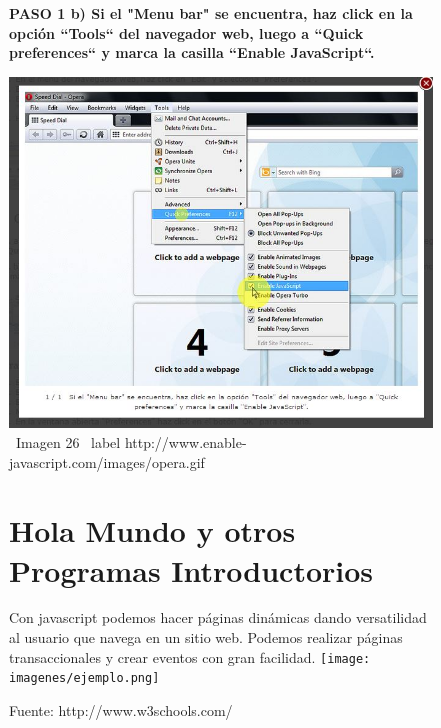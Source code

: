 \documentclass[11pt]{article} %
\begin{document}
\begin{figure}
\begin{center}

\begin{center}
\bf PASO 1
 b) Si el "Menu bar" se encuentra, haz click en la opción ``Tools`` del navegador web, luego a ``Quick preferences`` y marca la casilla ``Enable JavaScript``.
\end{center}

\includegraphics[height=8 cm, width=8 cm] {imagenes/opera 02.jpg}
\newline
\newline
\ Imagen 26
\ label {http://www.enable-javascript.com/images/opera.gif}



\section{Hola Mundo y otros Programas Introductorios} 

Con javascript podemos hacer páginas dinámicas dando versatilidad al usuario que navega en un sitio web. Podemos realizar páginas transaccionales y crear eventos con gran facilidad.
\texttt{[image: imagenes/ejemplo.png]}

\caption { Fuente: http://www.w3schools.com/ }





\end{center}
\end{figure}


\lstset{language=Pascal}          %
\end{document}
